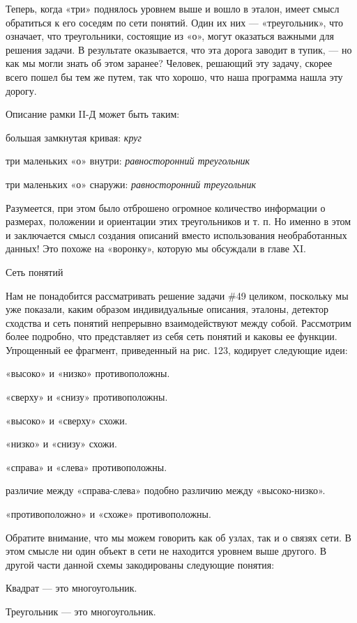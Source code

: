 \documentclass[../main.tex]{subfiles}
\begin{document}
Теперь, когда «три» поднялось уровнем выше и вошло в эталон, имеет смысл обратиться к его соседям по сети понятий. Один их них --- «треугольник», что означает, что треугольники, состоящие из «о», могут оказаться важными для решения задачи. В результате оказывается, что эта дорога заводит в тупик, --- но как мы могли знать об этом заранее? Человек, решающий эту задачу, скорее всего пошел бы тем же путем, так что хорошо, что наша программа нашла эту дорогу.

Описание рамки II-Д может быть таким:

большая замкнутая кривая: \emph{круг}

три маленьких «о» внутри: \emph{равносторонний треугольник}

три маленьких «о» снаружи: \emph{равносторонний треугольник}

Разумеется, при этом было отброшено огромное количество информации о размерах, положении и ориентации этих треугольников и т. п. Но именно в этом и заключается смысл создания описаний вместо использования необработанных данных! Это похоже на «воронку», которую мы обсуждали в главе XI.

Сеть понятий

Нам не понадобится рассматривать решение задачи \#49 целиком, поскольку мы уже показали, каким образом индивидуальные описания, эталоны, детектор сходства и сеть понятий непрерывно взаимодействуют между собой. Рассмотрим более подробно, что представляет из себя сеть понятий и каковы ее функции. Упрощенный ее фрагмент, приведенный на рис. 123, кодирует следующие идеи:

«высоко» и «низко» противоположны.

«сверху» и «снизу» противоположны.

«высоко» и «сверху» схожи.

«низко» и «снизу» схожи.

«справа» и «слева» противоположны.

различие между «справа-слева» подобно различию между «высоко-низко».

«противоположно» и «схоже» противоположны.

Обратите внимание, что мы можем говорить как об узлах, так и о связях сети. В этом смысле ни один объект в сети не находится уровнем выше другого. В другой части данной схемы закодированы следующие понятия:

Квадрат --- это многоугольник.

Треугольник --- это многоугольник.
\end{document}
